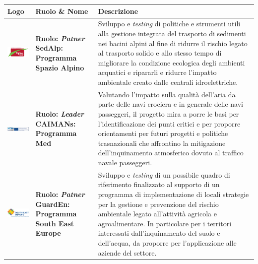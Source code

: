 \begin{longtable}{ p{} | p{} | p{}}

\textbf{Logo}& \textbf{Ruolo \& Nome}&  \textbf{Descrizione}\\

 \endhead
\midrule
\vfill \includegraphics[scale=0.8]{./capitoli/capitolo1/img/alpini} & \vfill \textbf{{\color{Plum}Ruolo}: \textit{Patner}} \newline \vfill \textbf{{\color{ForestGreen}SedAlp}: Programma Spazio Alpino}  &
 Sviluppo e \textit{testing} di politiche e strumenti utili alla gestione integrata del trasporto di sedimenti nei bacini alpini al fine di ridurre il rischio legato al trasporto solido e allo stesso tempo di migliorare la condizione ecologica degli ambienti acquatici e ripararli e ridurre l'impatto ambientale creato dalle centrali idroelettriche. \\
\midrule
\vfill \includegraphics[scale=0.7]{./capitoli/capitolo1/img/med} & \vfill \textbf{{\color{Plum}Ruolo}: \textit{Leader}} \newline \vfill \textbf{{\color{ForestGreen}CAIMANs}: Programma Med}  & Valutando l'impatto sulla qualità dell'aria da parte delle navi crociera e in generale delle navi passeggeri, il progetto mira a porre le basi per l'identificazione dei punti critici e per proporre orientamenti per futuri progetti e politiche trasnazionali che affrontino la mitigazione dell'inquinamento atmosferico dovuto al traffico navale passeggeri. \\
\midrule
\vfill \includegraphics[scale=0.7]{./capitoli/capitolo1/img/park} & \vfill \textbf{{\color{Plum}Ruolo}: \textit{Patner}} \newline \vfill \textbf{ {\color{ForestGreen}GuardEn}: Programma South East Europe } & Sviluppo e \textit{testing} di un possibile quadro di riferimento finalizzato al supporto di un programma di implementazione di locali strategie per la gestione e prevenzione del rischio ambientale legato all'attività agricola e agroalimentare. In particolare per i territori interessati dall'inquinamento del suolo e dell'acqua, da proporre per l'applicazione alle aziende del settore. \\

\end{longtable}
